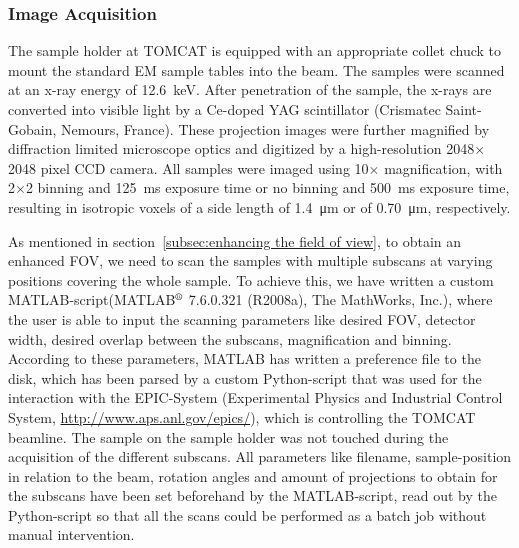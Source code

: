 \subsubsection{Image Acquisition}
The sample holder at TOMCAT is equipped with an appropriate collet chuck to mount the standard EM sample tables into the beam. The samples were scanned at an x-ray energy of \SI{12.6}{\kilo\electronvolt}. After penetration of the sample, the x-rays are converted into visible light by a Ce-doped YAG scintillator (Crismatec Saint-Gobain, Nemours, France). These projection images were further magnified by diffraction limited microscope optics and digitized by a high-resolution 2048$\times$2048 pixel CCD camera. All samples were imaged using 10$\times$ magnification, with 2$\times$2 binning and \SI{125}{\milli\second} exposure time or no binning and \SI{500}{\milli\second} exposure time, resulting in isotropic voxels of a side length of \SI{1.4}{\micro\meter} or of \SI{0.70}{\micro\meter}, respectively.

As mentioned in section~\ref{subsec:enhancing the field of view}, to obtain an enhanced FOV, we need to scan the samples with multiple subscans at varying positions covering the whole sample. To achieve this, we have written a custom MATLAB-script(MATLAB$^\text{\textregistered}$ 7.6.0.321 (R2008a), The MathWorks, Inc.), where the user is able to input the scanning parameters like desired FOV, detector width, desired overlap between the subscans, magnification and binning. According to these parameters, MATLAB has written a preference file to the disk, which has been parsed by a custom Python-script that was used for the interaction with the EPIC-System (Experimental Physics and Industrial Control System, \url{http://www.aps.anl.gov/epics/}), which is controlling the TOMCAT beamline. The sample on the sample holder was not touched during the acquisition of the different subscans. All parameters like filename, sample-position in relation to the beam, rotation angles and amount of projections to obtain for the subscans have been set beforehand by the MATLAB-script, read out by the Python-script so that all the scans could be performed as a batch job without manual intervention.

